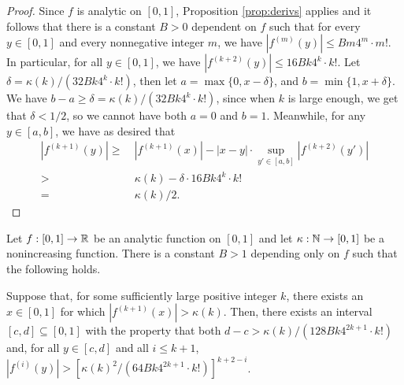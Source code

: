 \begin{proof}
Since $f$ is analytic on $[0,1]$, Proposition \ref{prop:derivs} applies and it follows that there is a constant $B > 0$ dependent on $f$ such that for every $y \in [0,1]$ and every nonnegative integer $m$, we have $|f^{(m)}(y)| \leq Bm4^m \cdot m!$. In particular, for all $y \in [0,1]$, we have $|f^{(k+2)}(y)| \leq 16 Bk4^k \cdot k!$. Let $\delta = \kappa(k)/(32 Bk4^k \cdot k!)$, then let $a = \max\{0, x-\delta\}$, and $b = \min\{1,x+\delta\}$. We have $b-a \geq \delta = \kappa(k)/(32 Bk4^k \cdot k!)$, since when $k$ is large enough, we get that $\delta<1/2$, so we cannot have both $a=0$ and $b=1$. Meanwhile, for any $y \in [a,b]$, we have as desired that
\begin{align*}
|f^{(k+1)}(y)| 
\geq & ~ |f^{(k+1)}(x)| - |x-y| \cdot \sup_{y' \in [a,b]} |f^{(k+2)}(y')| \\
> & ~ \kappa(k) - \delta \cdot 16 Bk4^k \cdot k! \\
= & ~ \kappa(k) / 2.
\end{align*}
\end{proof}

\begin{lemma} \label{lem:step3}
Let $f : [0,1] \to {\mathbb R}$ be an analytic function on $[0,1]$ and let $\kappa: {\mathbb N} \to [0,1]$ be a nonincreasing function. There is a constant $B>1$ depending only on $f$ such that the following holds.

Suppose that, for some sufficiently large positive integer $k$, there exists an $x\in [0,1]$ for which $|f^{(k+1)}(x)| > \kappa(k)$.
Then, there exists an interval $[c,d]\subseteq [0,1]$ with the property that both $d - c > \kappa(k) / (128 Bk4^{2k+1} \cdot k!)$ and, for all $y\in [c,d]$ and all $i\le k+1$, $|f^{(i)}(y)| > \left[ \kappa(k)^2 / (64 Bk4^{2k+1} \cdot k!) \right]^{k+2-i}$.
\end{lemma}

